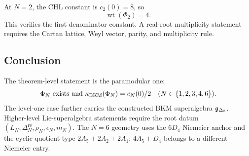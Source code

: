 At \(N=2\), the CHL constant is \(c_2(0)=8\), so
\[
  \operatorname{wt}(\Phi_2)=4 .
\]
This verifies the first denominator constant. A real-root multiplicity
statement requires the Cartan lattice, Weyl vector, parity, and
multiplicity rule.

\subsection*{Conclusion}

The theorem-level statement is the paramodular one:
\[
  \Phi_N \text{ exists and } \kappa_{\mathrm{BKM}}(\Phi_N)=c_N(0)/2
  \quad (N\in\{1,2,3,4,6\}).
\]
The level-one case further carries the constructed BKM superalgebra
\(\mathfrak{g}_{\Delta_5}\). Higher-level Lie-superalgebra statements require
the root datum \((L_N,\Delta^{\mathrm{re}}_N,\rho_N,\epsilon_N,m_N)\).
The \(N=6\) geometry uses the \(6D_4\) Niemeier anchor and the cyclic
quotient type \(2A_5+2A_2+2A_1\); \(4A_5+D_4\) belongs to a different
Niemeier entry.
